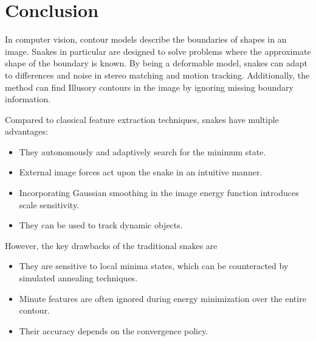 \documentclass[journal]{IEEEtran}
\begin{document}
\section{Conclusion}
In computer vision, contour models describe the boundaries of shapes in an image. Snakes in particular are designed to solve problems where the approximate shape of the boundary is known. By being a deformable model, snakes can adapt to differences and noise in stereo matching and motion tracking. Additionally, the method can find Illusory contours in the image by ignoring missing boundary information.

Compared to classical feature extraction techniques, snakes have multiple advantages:
\begin{itemize}
  \item They autonomously and adaptively search for the minimum state.
  \item External image forces act upon the snake in an intuitive manner.
  \item Incorporating Gaussian smoothing in the image energy function introduces scale sensitivity.
  \item They can be used to track dynamic objects.
\end{itemize}

However, the key drawbacks of the traditional snakes are
\begin{itemize}
  \item They are sensitive to local minima states, which can be counteracted by simulated annealing techniques.
  \item Minute features are often ignored during energy minimization over the entire contour.
  \item Their accuracy depends on the convergence policy.\cite{w2}
\end{itemize}

\ifCLASSOPTIONcaptionsoff
  \newpage
\fi



\end{document}

